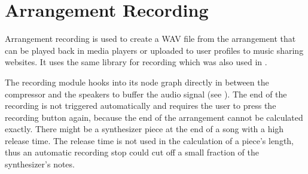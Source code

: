 \section{Arrangement Recording}
\label{impl-arrangement-recording}

Arrangement recording is used to create a WAV file from the arrangement that can be played back in media players or uploaded to user profiles to music sharing websites. It uses the same library for recording which was also used in .

The recording module hooks into its node graph directly in between the compressor and the speakers to buffer the audio signal (see ). The end of the recording is not triggered automatically and requires the user to press the recording button again, because the end of the arrangement cannot be calculated exactly. There might be a synthesizer piece at the end of a song with a high release time. The release time is not used in the calculation of a piece's length, thus an automatic recording stop could cut off a small fraction of the synthesizer's notes.